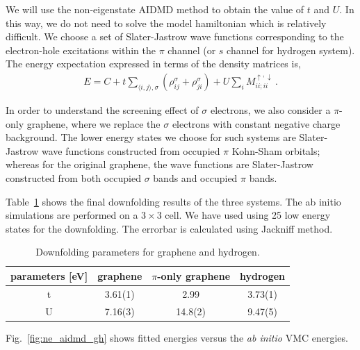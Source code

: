 \documentclass[aps, prb]{revtex4-1}
\begin{document}
We will use the non-eigenstate AIDMD method to obtain the value of $t$ and $U$. In this way, we do not need to solve the model hamiltonian which is relatively difficult. We choose a set of Slater-Jastrow wave functions corresponding to the electron-hole excitations within the $\pi$ channel (or $s$ channel for hydrogen system). The energy expectation expressed in terms of the density matrices is, 
\begin{eqnarray}\label{eq:en}
E = C + t\sum_{\langle i, j\rangle, \sigma}( \rho_{ij}^\sigma + \rho_{ji}^\sigma) + U \sum_{i}M_{ii;ii}^{\uparrow,\downarrow}\,.
\end{eqnarray}

In order to understand the screening effect of $\sigma$ electrons, we also consider a $\pi$-only graphene, where we replace the $\sigma$ electrons with constant negative charge background. The lower energy states we choose for such systems are Slater-Jastrow wave functions constructed from occupied $\pi$ Kohn-Sham orbitals; whereas for the original graphene, the wave functions are Slater-Jastrow constructed from both occupied $\sigma$ bands and occupied $\pi$ bands. 

Table~\ref{tab:grpheffm} shows the final downfolding results of the three systems. The ab initio simulations are performed on a $3\times3$ cell. We have used using 25 low energy states for the downfolding. The errorbar is calculated using Jackniff method. 
\begin{table}[ht]\caption{Downfolding parameters for graphene and hydrogen.}\label{tab:grpheffm}
\centering
\begin{tabular}{|c|c|c|c|}
\hline
parameters [eV] & graphene & $\pi$-only graphene &hydrogen \\
\hline
\hline
t & 3.61(1) & 2.99 & 3.73(1)\\
U & 7.16(3) & 14.8(2) & 9.47(5)\\
\hline
\end{tabular}
\end{table} 
Fig.~\ref{fig:ne_aidmd_gh} shows fitted energies versus the \textit{ab initio} VMC energies. 
\end{document}
